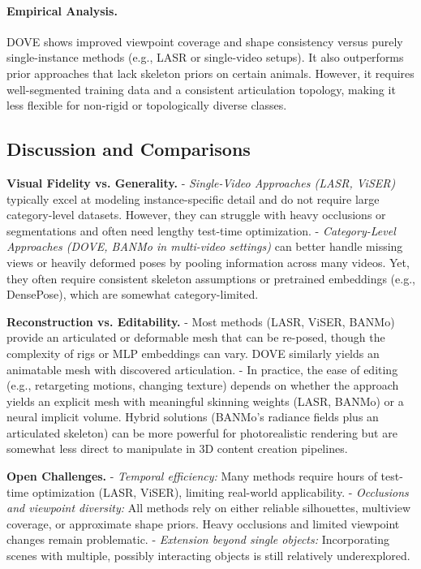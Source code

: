 \documentclass[11pt]{article}
\begin{document}
\paragraph{Empirical Analysis.}
DOVE shows improved viewpoint coverage and shape consistency versus purely single-instance methods (e.g., LASR or single-video setups). It also outperforms prior approaches that lack skeleton priors on certain animals. However, it requires well-segmented training data and a consistent articulation topology, making it less flexible for non-rigid or topologically diverse classes.

\subsection{Discussion and Comparisons}
\textbf{Visual Fidelity vs. Generality.}
- \emph{Single-Video Approaches (LASR, ViSER)} typically excel at modeling instance-specific detail and do not require large category-level datasets. However, they can struggle with heavy occlusions or segmentations and often need lengthy test-time optimization.
- \emph{Category-Level Approaches (DOVE, BANMo in multi-video settings)} can better handle missing views or heavily deformed poses by pooling information across many videos. Yet, they often require consistent skeleton assumptions or pretrained embeddings (e.g., DensePose), which are somewhat category-limited.

\textbf{Reconstruction vs. Editability.}
- Most methods (LASR, ViSER, BANMo) provide an articulated or deformable mesh that can be re-posed, though the complexity of rigs or MLP embeddings can vary. DOVE similarly yields an animatable mesh with discovered articulation.
- In practice, the ease of editing (e.g., retargeting motions, changing texture) depends on whether the approach yields an explicit mesh with meaningful skinning weights (LASR, BANMo) or a neural implicit volume. Hybrid solutions (BANMo’s radiance fields plus an articulated skeleton) can be more powerful for photorealistic rendering but are somewhat less direct to manipulate in 3D content creation pipelines.

\textbf{Open Challenges.}
- \emph{Temporal efficiency:} Many methods require hours of test-time optimization (LASR, ViSER), limiting real-world applicability.
- \emph{Occlusions and viewpoint diversity:} All methods rely on either reliable silhouettes, multiview coverage, or approximate shape priors. Heavy occlusions and limited viewpoint changes remain problematic.
- \emph{Extension beyond single objects:} Incorporating scenes with multiple, possibly interacting objects is still relatively underexplored.
\end{document}
